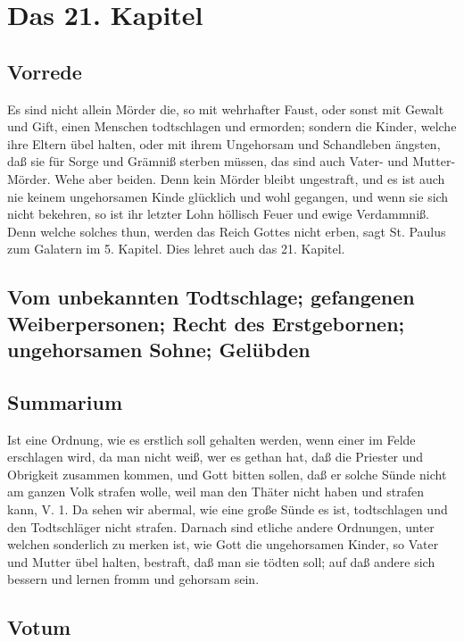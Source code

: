 \chapter{Das 21. Kapitel}

\section{Vorrede}

Es sind nicht allein Mörder die, so mit wehrhafter Faust, oder sonst mit Gewalt und Gift,
einen Menschen todtschlagen und ermorden; sondern die Kinder, welche ihre Eltern übel halten, oder mit ihrem Ungehorsam und Schandleben ängsten, daß sie für Sorge und Grämniß sterben müssen, das sind auch Vater- und Mutter-Mörder. Wehe aber beiden. Denn kein Mörder bleibt ungestraft, und es ist auch nie keinem ungehorsamen Kinde glücklich und wohl gegangen, und wenn sie sich nicht bekehren, so ist ihr letzter Lohn höllisch Feuer und ewige Verdammniß. Denn welche solches thun, werden das Reich Gottes nicht erben, sagt St. Paulus zum Galatern im 5. Kapitel. Dies lehret auch das 21. Kapitel.

\section[Vom unbekannten Todtschlage; gefangenen Weiberpersonen; Recht des Erstgebornen;]{Vom unbekannten Todtschlage; gefangenen Weiberpersonen; Recht des Erstgebornen; ungehorsamen Sohne; Gelübden}

\section{Summarium}

Ist eine Ordnung, wie es erstlich soll gehalten werden, wenn einer im Felde erschlagen wird, da man nicht weiß, wer es gethan hat, daß die Priester und Obrigkeit zusammen kommen, und Gott bitten sollen, daß er solche Sünde nicht am ganzen Volk strafen wolle, weil man den Thäter nicht haben und strafen kann, V. 1. Da sehen wir abermal, wie eine große Sünde es ist, todtschlagen und den Todtschläger nicht strafen. Darnach sind etliche andere Ordnungen, unter welchen sonderlich zu merken ist, wie Gott die ungehorsamen Kinder, so Vater und Mutter übel halten, bestraft, daß man sie tödten soll; auf daß andere sich bessern und lernen fromm und gehorsam sein.

\section{Votum}

